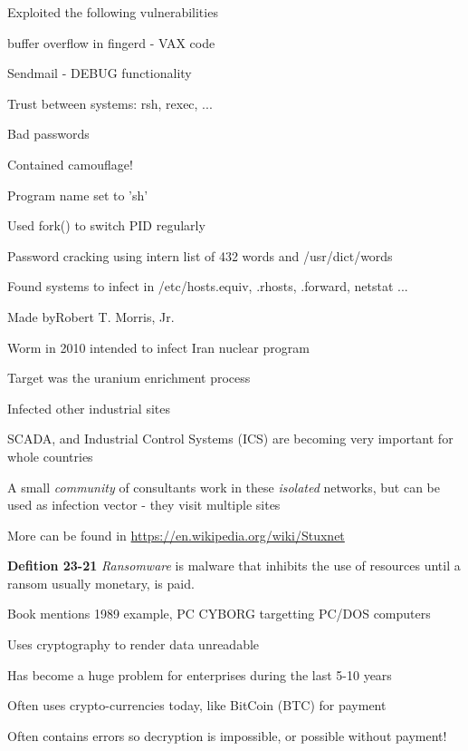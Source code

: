 \documentclass[Screen16to9,17pt]{foils}
\begin{document}
\begin{list1}
\item Exploited the following vulnerabilities
\begin{list2}
\item buffer overflow in fingerd - VAX code
\item Sendmail - DEBUG functionality
\item Trust between systems: rsh, rexec, ...
\item Bad passwords
\end{list2}
\item Contained camouflage!
\begin{list2}
\item Program name set to 'sh'
\item Used fork() to switch PID regularly
\item Password cracking using intern list of 432 words and /usr/dict/words
\item Found systems to infect in /etc/hosts.equiv, .rhosts, .forward, netstat ...
\end{list2}
\item Made byRobert T. Morris, Jr.
\end{list1}



\begin{list1}
\item Worm in 2010 intended to infect Iran nuclear program
\item Target was the uranium enrichment process
\item Infected other industrial sites
\item SCADA, and Industrial Control Systems (ICS) are becoming very important for whole countries
\item A small \emph{community} of consultants work in these \emph{isolated} networks, but can be used as infection vector - they visit multiple sites
\item More can be found in \url{https://en.wikipedia.org/wiki/Stuxnet}
\end{list1}




\begin{list1}
\item {\bf Defition 23-21} \emph{Ransomware} is malware that inhibits the use of resources until a ransom usually monetary, is paid.
\item Book mentions 1989 example, PC CYBORG targetting PC/DOS computers
\item Uses cryptography to render data unreadable
\item Has become a huge problem for enterprises during the last 5-10 years
\item Often uses crypto-currencies today, like BitCoin (BTC) for payment
\item Often contains errors so decryption is impossible, or possible without payment!
\end{list1}
\end{document}
